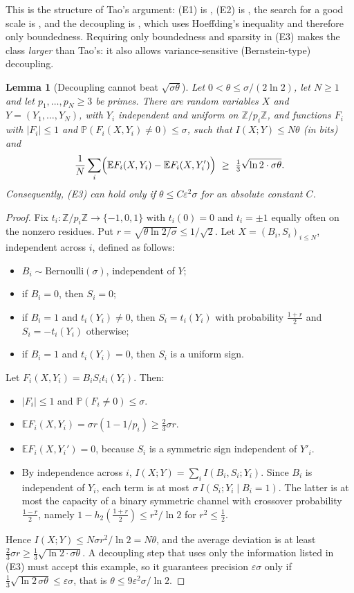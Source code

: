 \documentclass[11pt]{amsart}
\newtheorem{lemma}[theorem]{Lemma}
\theoremstyle{definition}
\theoremstyle{remark}
\newcommand{\Z}{\mathbb{Z}}
\begin{document}
This is the structure of Tao's argument: (E1) is \cite[(3.8)]{Tao16}, (E2) is \cite[(3.12)]{Tao16}, the search for a good scale is \cite[Lemma~3.2]{Tao16}, and the decoupling is \cite[Lemmas~3.3, 3.5]{Tao16}, which uses Hoeffding's inequality and therefore only boundedness. Requiring only boundedness and sparsity in (E3) makes the class \emph{larger} than Tao's: it also allows variance-sensitive (Bernstein-type) decoupling.

\begin{lemma}[Decoupling cannot beat $\sqrt{\sigma\theta}$]\label{lem:decouple-sharp}
Let $0<\theta\le\sigma/(2\ln2)$, let $N\ge1$ and let $p_1,\dots,p_N\ge3$ be primes. There are random variables $X$ and $Y=(Y_1,\dots,Y_N)$, with $Y_i$ independent and uniform on $\Z/p_i\Z$, and functions $F_i$ with $|F_i|\le1$ and $\mathbb P(F_i(X,Y_i)\ne0)\le\sigma$, such that $I(X;Y)\le N\theta$ (in bits) and
\[
\frac1N\sum_i\Bigl(\mathbb E F_i(X,Y_i)-\mathbb E F_i(X,Y_i')\Bigr)\ \ge\ \tfrac13\sqrt{\ln2\cdot\sigma\theta}.
\]
Consequently, (E3) can hold only if $\theta\le C\varepsilon^2\sigma$ for an absolute constant $C$.
\end{lemma}
\begin{proof}
Fix $t_i:\Z/p_i\Z\to\{-1,0,1\}$ with $t_i(0)=0$ and $t_i=\pm1$ equally often on the nonzero residues. Put $r=\sqrt{\theta\ln2/\sigma}\le1/\sqrt2$. Let $X=(B_i,S_i)_{i\le N}$, independent across $i$, defined as follows:
\begin{itemize}
\item $B_i\sim\mathrm{Bernoulli}(\sigma)$, independent of $Y$;
\item if $B_i=0$, then $S_i=0$;
\item if $B_i=1$ and $t_i(Y_i)\ne0$, then $S_i=t_i(Y_i)$ with probability $\frac{1+r}2$ and $S_i=-t_i(Y_i)$ otherwise;
\item if $B_i=1$ and $t_i(Y_i)=0$, then $S_i$ is a uniform sign.
\end{itemize}
Let $F_i(X,Y_i)=B_iS_it_i(Y_i)$. Then:
\begin{itemize}
\item $|F_i|\le1$ and $\mathbb P(F_i\ne0)\le\sigma$.
\item $\mathbb EF_i(X,Y_i)=\sigma r(1-1/p_i)\ge\frac23\sigma r$.
\item $\mathbb EF_i(X,Y_i')=0$, because $S_i$ is a symmetric sign independent of $Y'_i$.
\item By independence across $i$, $I(X;Y)=\sum_iI(B_i,S_i;Y_i)$. Since $B_i$ is independent of $Y_i$, each term is at most $\sigma\,I(S_i;Y_i\mid B_i=1)$. The latter is at most the capacity of a binary symmetric channel with crossover probability $\frac{1-r}2$, namely $1-h_2(\frac{1+r}2)\le r^2/\ln2$ for $r^2\le\frac12$.
\end{itemize}
Hence $I(X;Y)\le N\sigma r^2/\ln2=N\theta$, and the average deviation is at least $\frac23\sigma r\ge\frac13\sqrt{\ln2\cdot\sigma\theta}$. A decoupling step that uses only the information listed in (E3) must accept this example, so it guarantees precision $\varepsilon\sigma$ only if $\frac13\sqrt{\ln2\,\sigma\theta}\le\varepsilon\sigma$, that is $\theta\le9\varepsilon^2\sigma/\ln2$.
\end{proof}
\end{document}
